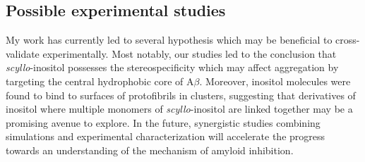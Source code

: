 \subsection{Possible experimental studies}
My work has currently led to several hypothesis which may be beneficial to cross-validate experimentally. Most notably, our studies led to the conclusion that \textit{scyllo}-inositol possesses the stereospecificity which may affect aggregation by targeting the central hydrophobic core of A$\beta$.  Moreover, inositol molecules were found to bind to surfaces of protofibrils in clusters, suggesting that derivatives of inositol where multiple monomers of \textit{scyllo}-inositol are linked together may be a promising avenue to explore. In the future, synergistic studies combining simulations and experimental characterization will accelerate the progress towards an understanding of the mechanism of amyloid inhibition.   





\begin{singlespace}


\end{singlespace}

